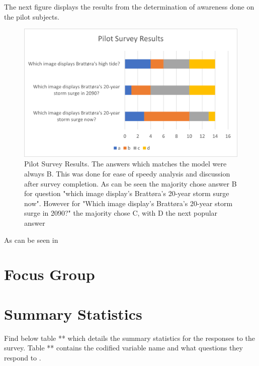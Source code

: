 The next figure displays the results from the determination of awareness done on the pilot subjects.

\begin{figure}[h]
    \centering
    \includegraphics{fig_results/pilot-survey-results.png}
    \caption{Pilot Survey Results. The answers which matches the model \cite{kartverket_se_2021} were always B. This was done for ease of speedy analysis and discussion after survey completion. As can be seen the majority chose answer B for question "which image display's Brattøra's 20-year storm surge now". However for "Which image display's Brattøra's 20-year storm surge in 2090?" the majority chose C, with D the next popular answer   }
    \label{fig:pilot_survey_results}
\end{figure}

As can be seen in 

\section{Focus Group}





\section{Summary Statistics }
Find below table ** which details the summary statistics for the responses to the survey. Table ** contains the codified variable name and what questions they respond to .



